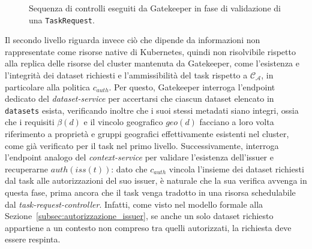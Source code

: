 \begin{figure}[htb]
    \caption{Sequenza di controlli eseguiti da Gatekeeper in fase di validazione di una \texttt{TaskRequest}.}
    \label{fig:gatekeeper_dettaglio}
\end{figure}

Il secondo livello riguarda invece ciò che dipende da informazioni non rappresentate come risorse native di Kubernetes, quindi non risolvibile rispetto alla replica delle risorse del cluster mantenuta da Gatekeeper, come l'esistenza e l'integrità dei dataset richiesti e l'ammissibilità del task rispetto a $\mathcal{C_A}$, in particolare alla politica $c_{auth}$. Per questo, Gatekeeper interroga l'endpoint dedicato del \emph{dataset-service} per accertarsi che ciascun dataset elencato in \texttt{datasets} esista, verificando inoltre che i suoi stessi metadati siano integri, ossia che i requisiti $\beta(d)$ e il vincolo geografico $geo(d)$ facciano a loro volta riferimento a proprietà e gruppi geografici effettivamente esistenti nel cluster, come già verificato per il task nel primo livello. Successivamente, interroga l'endpoint analogo del \emph{context-service} per validare l'esistenza dell'issuer e recuperarne $auth(iss(t))$: dato che $c_{auth}$ vincola l'insieme dei dataset richiesti dal task alle autorizzazioni del suo issuer, è naturale che la sua verifica avvenga in questa fase, prima ancora che il task venga tradotto in una risorsa schedulabile dal \emph{task-request-controller}. Infatti, come visto nel modello formale alla Sezione~\ref{subsec:autorizzazione_issuer}, se anche un solo dataset richiesto appartiene a un contesto non compreso tra quelli autorizzati, la richiesta deve essere respinta.

